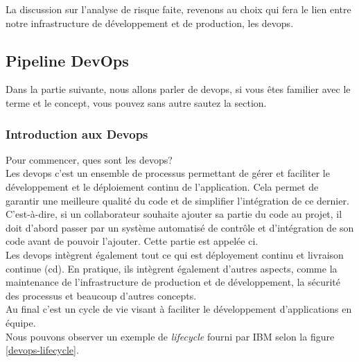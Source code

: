 \documentclass[
    iai, %
    il, %
]{heig-tb}
\begin{document}
\clearpage

La discussion sur l'analyse de risque faite, revenons au choix qui fera le lien entre notre infrastructure de développement et de production, les \Gls{devops}.

\subsection{Pipeline DevOps}

Dans la partie suivante, nous allons parler de \Gls{devops}, si vous êtes familier avec le terme et le concept, vous pouvez sans autre sautez la section.

\subsubsection{Introduction aux Devops}

Pour commencer, ques sont les \Gls{devops}?\\
Les \Gls{devops} c'est un ensemble de processus permettant de gérer et faciliter le développement et le déploiement continu de l'application. Cela permet de garantir une meilleure qualité du code et de simplifier l'intégration de ce dernier. C'est-à-dire, si un collaborateur souhaite ajouter sa partie du code au projet, il doit d'abord passer par un système automatisé de contrôle et d'intégration de son code avant de pouvoir l'ajouter. Cette partie est appelée \Gls{ci}.\\
Les \Gls{devops} intègrent également tout ce qui est déployement continu et livraison continue (\Gls{cd}).
En pratique, ils intègrent également d'autres aspects, comme la maintenance de l'infrastructure de
production et de développement, la sécurité des processus et beaucoup d'autres concepts.\\
Au final c'est un cycle de vie visant à faciliter le développement d'applications en équipe.\\
Nous pouvons observer un exemple de \emph{lifecycle} fourni par IBM selon la figure \ref{devops-lifecycle}.
\end{document}
